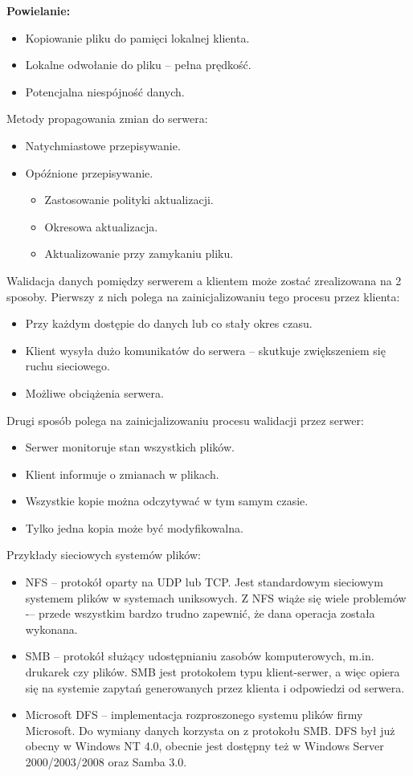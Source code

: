 \textbf{Powielanie:}
\begin{itemize}
    \item Kopiowanie pliku do pamięci lokalnej klienta.
    \item Lokalne odwołanie do pliku -- pełna prędkość.
    \item Potencjalna niespójność danych.
\end{itemize}

Metody propagowania zmian do serwera:
\begin{itemize}
    \item Natychmiastowe przepisywanie.
    \item Opóźnione przepisywanie.
    \begin{itemize}
        \item Zastosowanie polityki aktualizacji.
        \item Okresowa aktualizacja.
        \item Aktualizowanie przy zamykaniu pliku.
    \end{itemize}
\end{itemize}

Walidacja danych pomiędzy serwerem a klientem może zostać zrealizowana na 2 sposoby. 
Pierwszy z nich polega na zainicjalizowaniu tego procesu przez klienta:
\begin{itemize}
    \item Przy każdym dostępie do danych lub co stały okres czasu.
    \item Klient wysyła dużo komunikatów do serwera -- skutkuje zwiększeniem się ruchu sieciowego.
    \item Możliwe obciążenia serwera.
\end{itemize}

Drugi sposób polega na zainicjalizowaniu procesu walidacji przez serwer:
\begin{itemize}
    \item Serwer monitoruje stan wszystkich plików.
    \item Klient informuje o zmianach w plikach.
    \item Wszystkie kopie można odczytywać w tym samym czasie.
    \item Tylko jedna kopia może być modyfikowalna.
\end{itemize}

Przykłady sieciowych systemów plików:
\begin{itemize}
    \item NFS -- protokół oparty na UDP lub TCP. Jest standardowym sieciowym systemem plików w systemach uniksowych. Z NFS wiąże się wiele problemów -– przede wszystkim bardzo trudno zapewnić, że dana operacja została wykonana.
    \item SMB --  protokół służący udostępnianiu zasobów komputerowych, m.in. drukarek czy plików. SMB jest protokołem typu klient-serwer, a więc opiera się na systemie zapytań generowanych przez klienta i odpowiedzi od serwera. 
    \item Microsoft DFS -- implementacja rozproszonego systemu plików firmy Microsoft. Do wymiany danych korzysta on z protokołu SMB. DFS był już obecny w Windows NT 4.0, obecnie jest dostępny też w Windows Server 2000/2003/2008 oraz Samba 3.0.
\end{itemize}